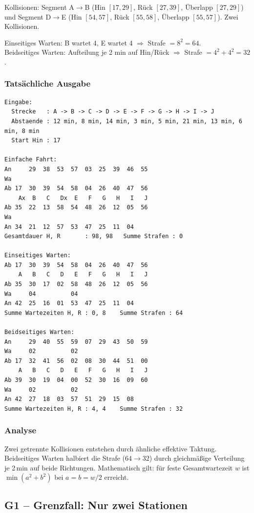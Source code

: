 \documentclass[12pt,a4paper]{article}
\begin{document}
Kollisionen: Segment A$\to$B (Hin $[17,29]$, Rück $[27,39]$, Überlapp $[27,29]$) und Segment D$\to$E (Hin $[54,57]$, Rück $[55,58]$, Überlapp $[55,57]$). Zwei Kollisionen.

Einseitiges Warten: B wartet 4, E wartet 4 $\Rightarrow$ Strafe $= 8^2 = 64$.\\
Beidseitiges Warten: Aufteilung je 2 min auf Hin/Rück $\Rightarrow$ Strafe $= 4^2 + 4^2 = 32$.

\subsubsection*{Tatsächliche Ausgabe}
\begin{lstlisting}
Eingabe:
  Strecke   : A -> B -> C -> D -> E -> F -> G -> H -> I -> J
  Abstaende : 12 min, 8 min, 14 min, 3 min, 5 min, 21 min, 13 min, 6 min, 8 min
  Start Hin : 17

Einfache Fahrt:
An     29  38  53  57  03  25  39  46  55
Wa
Ab 17  30  39  54  58  04  26  40  47  56
    Ax  B   C   Dx  E   F   G   H   I   J
Ab 35  22  13  58  54  48  26  12  05  56
Wa
An 34  21  12  57  53  47  25  11  04
Gesamtdauer H, R       : 98, 98   Summe Strafen : 0

Einseitiges Warten:
Ab 17  30  39  54  58  04  26  40  47  56
    A   B   C   D   E   F   G   H   I   J
Ab 35  30  17  02  58  48  26  12  05  56
Wa     04          04
An 42  25  16  01  53  47  25  11  04
Summe Wartezeiten H, R : 0, 8    Summe Strafen : 64

Beidseitiges Warten:
An     29  40  55  59  07  29  43  50  59
Wa     02          02
Ab 17  32  41  56  02  08  30  44  51  00
    A   B   C   D   E   F   G   H   I   J
Ab 39  30  19  04  00  52  30  16  09  60
Wa     02          02
An 42  27  18  03  57  51  29  15  08
Summe Wartezeiten H, R : 4, 4    Summe Strafen : 32
\end{lstlisting}

\subsubsection*{Analyse}
Zwei getrennte Kollisionen entstehen durch ähnliche effektive Taktung.
Beidseitiges Warten halbiert die Strafe ($64 \to 32$) durch gleichmäßige Verteilung je 2\,min auf beide Richtungen.
Mathematisch gilt: für feste Gesamtwartezeit $w$ ist $\min(a^2+b^2)$ bei $a=b=w/2$ erreicht.

\subsection{G1 – Grenzfall: Nur zwei Stationen}
\label{test:g1}
\end{document}
